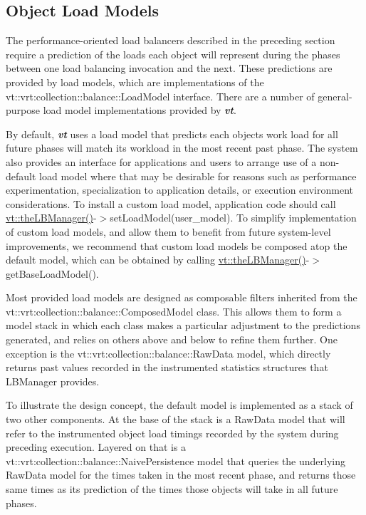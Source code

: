 \hypertarget{lb-manager_load-models}{}\subsection{Object Load Models}\label{lb-manager_load-models}
The performance-\/oriented load balancers described in the preceding section require a prediction of the loads each object will represent during the phases between one load balancing invocation and the next. These predictions are provided by load models, which are implementations of the {\ttfamily vt\+::vrt\+:collection\+:\+:balance\+::\+Load\+Model} interface. There are a number of general-\/purpose load model implementations provided by {\bfseries {\itshape vt}}.

By default, {\bfseries {\itshape vt}} uses a load model that predicts each object\textquotesingle{}s work load for all future phases will match its workload in the most recent past phase. The system also provides an interface for applications and users to arrange use of a non-\/default load model where that may be desirable for reasons such as performance experimentation, specialization to application details, or execution environment considerations. To install a custom load model, application code should call {\ttfamily \hyperlink{namespacevt_a05187076eac8c66c9951b062b0955520}{vt\+::the\+L\+B\+Manager()}-\/$>$set\+Load\+Model(user\+\_\+model)}. To simplify implementation of custom load models, and allow them to benefit from future system-\/level improvements, we recommend that custom load models be composed atop the default model, which can be obtained by calling {\ttfamily \hyperlink{namespacevt_a05187076eac8c66c9951b062b0955520}{vt\+::the\+L\+B\+Manager()}-\/$>$get\+Base\+Load\+Model()}.

Most provided load models are designed as composable filters inherited from the {\ttfamily vt\+::vrt\+:collection\+:\+:balance\+::\+Composed\+Model} class. This allows them to form a \textquotesingle{}model stack\textquotesingle{} in which each class makes a particular adjustment to the predictions generated, and relies on others above and below to refine them further. One exception is the {\ttfamily vt\+::vrt\+:collection\+:\+:balance\+::\+Raw\+Data} model, which directly returns past values recorded in the instrumented statistics structures that {\ttfamily L\+B\+Manager} provides.

To illustrate the design concept, the default model is implemented as a stack of two other components. At the base of the stack is a {\ttfamily Raw\+Data} model that will refer to the instrumented object load timings recorded by the system during preceding execution. Layered on that is a {\ttfamily vt\+::vrt\+:collection\+:\+:balance\+::\+Naive\+Persistence} model that queries the underlying {\ttfamily Raw\+Data} model for the times taken in the most recent phase, and returns those same times as its prediction of the times those objects will take in all future phases.

